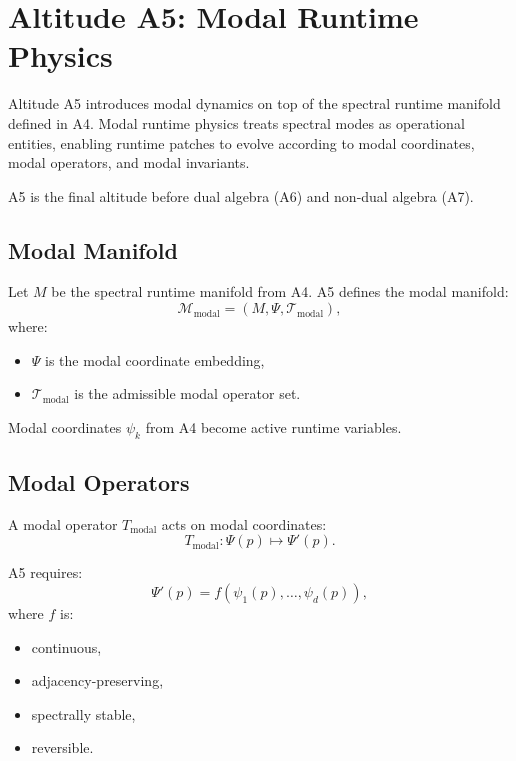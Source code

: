 
\section{Altitude A5: Modal Runtime Physics}

Altitude A5 introduces modal dynamics on top of the spectral runtime manifold
defined in A4. Modal runtime physics treats spectral modes as operational
entities, enabling runtime patches to evolve according to modal coordinates,
modal operators, and modal invariants.

A5 is the final altitude before dual algebra (A6) and non-dual algebra (A7).

\subsection{Modal Manifold}

Let $M$ be the spectral runtime manifold from A4. A5 defines the modal manifold:
\[
\mathcal{M}_{\mathrm{modal}} = (M, \Psi, \mathcal{T}_{\mathrm{modal}}),
\]
where:
\begin{itemize}
  \item $\Psi$ is the modal coordinate embedding,
  \item $\mathcal{T}_{\mathrm{modal}}$ is the admissible modal operator set.
\end{itemize}

Modal coordinates $\psi_k$ from A4 become active runtime variables.

\subsection{Modal Operators}

A modal operator $T_{\mathrm{modal}}$ acts on modal coordinates:
\[
T_{\mathrm{modal}} : \Psi(p) \mapsto \Psi'(p).
\]

A5 requires:
\[
\Psi'(p) = f(\psi_1(p), \ldots, \psi_d(p)),
\]
where $f$ is:
\begin{itemize}
  \item continuous,
  \item adjacency-preserving,
  \item spectrally stable,
  \item reversible.
\end{itemize}

